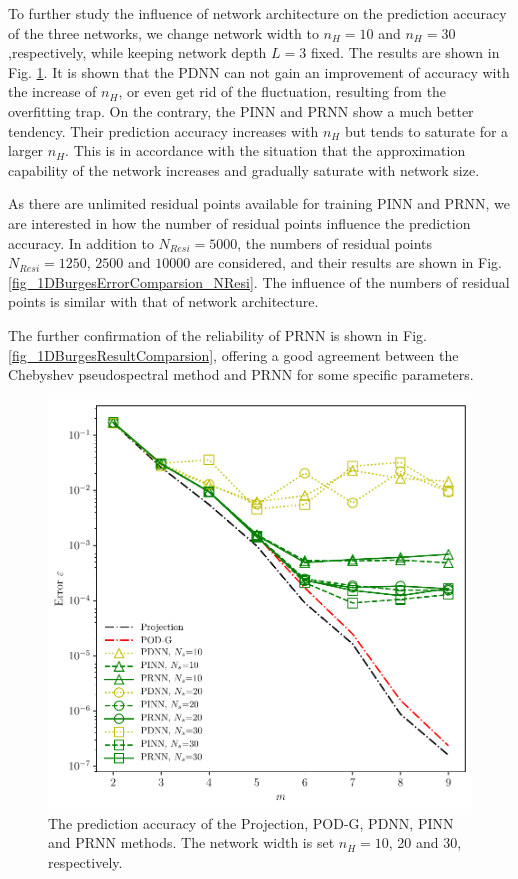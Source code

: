 \documentclass[preprint, 10pt]{elsarticle}
\begin{document}
To further study the influence of network architecture on the prediction accuracy of the three networks, we change network width to $n_H=10$ and $n_H=30$,respectively, while keeping network depth $L=3$ fixed. The results are shown in Fig. \ref{fig_1DBurgesErrorComparsion_Netsize}. It is shown that the PDNN can not gain an improvement of accuracy with the increase of $n_H$, or even get rid of the fluctuation, resulting from the overfitting trap. On the contrary, the PINN and PRNN show a much better tendency. Their prediction accuracy increases with $n_H$ but tends to saturate for a larger $n_H$. This is in accordance with the situation that the approximation capability of the network increases and gradually saturate with network size.

As there are unlimited residual points available  for training PINN and PRNN, we are interested in how the number of residual points influence the prediction accuracy. In addition to $N_{Resi}=5000$, the numbers of residual points $N_{Resi}=1250$, $2500$ and $10000$ are considered, and their results are shown in Fig. \ref{fig_1DBurgesErrorComparsion_NResi}. The influence of the numbers of residual points is similar with that of network architecture.

The further confirmation of the reliability of PRNN is shown in Fig. \ref{fig_1DBurgesResultComparsion}, offering a good agreement between the Chebyshev pseudospectral method and PRNN for some specific parameters.

\begin{figure}[!ht]
  \centering
  \includegraphics[width=12cm]{../../pythonNN/1DBurges/fig/ErrorComparsion_Netsize.pdf}
\caption{The prediction accuracy of the Projection, POD-G, PDNN, PINN and PRNN methods. The network width is set $n_H=10$, 20 and 30, respectively.}
\label{fig_1DBurgesErrorComparsion_Netsize}
\end{figure}
\end{document}
